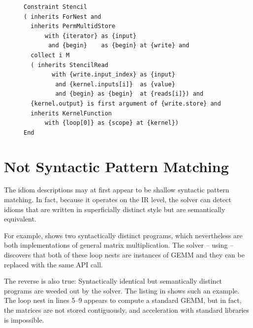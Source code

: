 \begin{figure}[t]
\begin{lstlisting}[language=IDL, label={fig:stencilcompute}, caption=
   {IDL specification of a basic stencil computation}]
Constraint Stencil
( inherits ForNest and
  inherits PermMultidStore
      with {iterator} as {input}
       and {begin}    as {begin} at {write} and
  collect i M
  ( inherits StencilRead
        with {write.input_index} as {input}
         and {kernel.inputs[i]}  as {value}
         and {begin} as {begin}  at {reads[i]}) and
  {kernel.output} is first argument of {write.store} and
  inherits KernelFunction
      with {loop[0]} as {scope} at {kernel})
End
\end{lstlisting}
\end{figure}

\section{Not Syntactic Pattern Matching}

    The idiom descriptions may at first appear to be shallow syntactic pattern
    matching.
    In fact, because it operates on the IR level, the solver can detect
    idioms that are written in superficially distinct style but are semantically
    equivalent.

    For example,  shows two syntactically distinct
    programs, which nevertheless are both implementations of general matrix
    multiplication.
    The solver -- using  -- discovers that both of these
    loop nests are instances of GEMM and they can be replaced with the same
    API call.

    The reverse is also true:
    Syntactically identical but semantically distinct programs are weeded out by
    the solver.
    The listing in  shows such an example.
    The loop nest in lines 5--9 appears to compute a standard GEMM, but in fact,
    the matrices are not stored contiguously, and acceleration with standard
    libraries is impossible.

